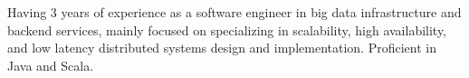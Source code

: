 
Having 3 years of experience as a software engineer in big data infrastructure and backend services, mainly focused on specializing in scalability, high availability, and low latency distributed systems design and implementation. Proficient in Java and Scala.  \\